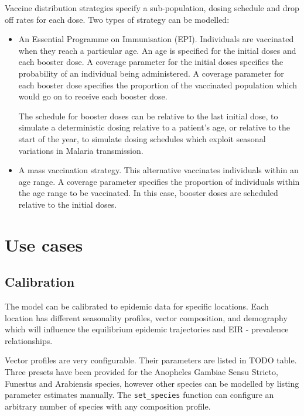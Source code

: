 \documentclass{bmcart}
\begin{document}
Vaccine distribution strategies specify a sub-population, dosing schedule and drop off rates for each dose. Two types of strategy can be modelled:

\begin{itemize}
\item An Essential Programme on Immunisation (EPI). Individuals are vaccinated when they reach a particular age. An age is specified for the initial doses and each booster dose. A coverage parameter for the initial doses specifies the probability of an individual being administered. A coverage parameter for each booster dose specifies the proportion of the vaccinated population which would go on to receive each booster dose.

The schedule for booster doses can be relative to the last initial dose, to simulate a deterministic dosing relative to a patient's age, or relative to the start of the year, to simulate dosing schedules which exploit seasonal variations in Malaria transmission.

\item A mass vaccination strategy. This alternative vaccinates individuals within an age range. A coverage parameter specifies the proportion of individuals within the age range to be vaccinated. In this case, booster doses are scheduled relative to the initial doses.
\end{itemize}

\section*{Use cases}

\subsection*{Calibration}

The model can be calibrated to epidemic data for specific locations. Each location has different seasonality profiles, vector composition, and demography which will influence the equilibrium epidemic trajectories and EIR - prevalence relationships.

Vector profiles are very configurable. Their parameters are listed in TODO table. Three presets have been provided for the Anopheles Gambiae Sensu Stricto, Funestus and Arabiensis species, however other species can be modelled by listing parameter estimates manually. The \lstinline{set_species} function can configure an arbitrary number of species with any composition profile.
\end{document}
